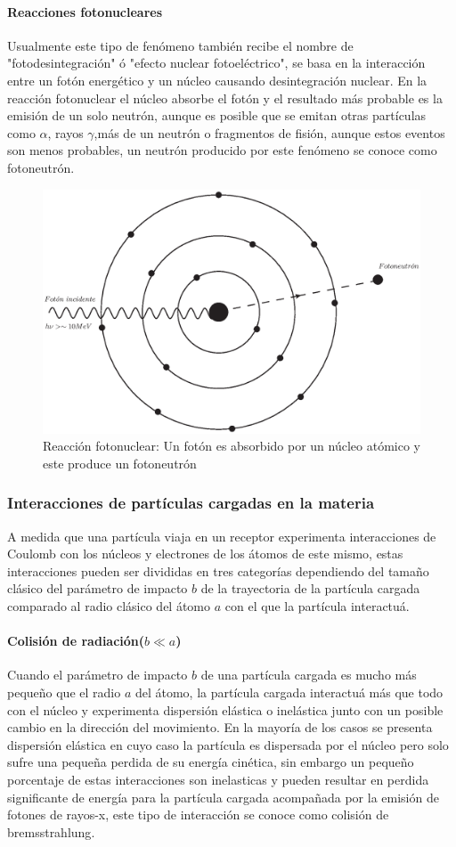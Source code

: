\paragraph{Reacciones fotonucleares}
 Usualmente este tipo de fenómeno también recibe el nombre de "fotodesintegración" ó "efecto nuclear fotoeléctrico", se basa en la interacción entre un fotón energético y un núcleo causando desintegración nuclear. En la reacción fotonuclear el núcleo absorbe el fotón y el resultado más probable es la emisión de un solo neutrón, aunque es posible que se emitan otras partículas como $\alpha$, rayos $\gamma$,más de un neutrón o fragmentos de fisión, aunque estos eventos son menos probables, un neutrón producido por este fenómeno se conoce como fotoneutrón\cite{Podgorsak}.

 \begin{figure}[htbp]
     \centering
     \includegraphics[width=.71\linewidth]{./Figures/fotoneu.eps}
     \caption[Reacción fotonuclear]{Reacción fotonuclear: Un fotón es absorbido por un núcleo atómico y este produce un fotoneutrón}
     \label{fig:RF}
 \end{figure}


\subsubsection{Interacciones de partículas cargadas en la materia}
A medida que una partícula viaja en un receptor experimenta interacciones de Coulomb con los núcleos y electrones de los átomos de este mismo, estas interacciones pueden ser divididas en tres categorías dependiendo del tamaño clásico del parámetro de impacto $b$ de la trayectoria de la partícula cargada comparado al radio clásico del átomo $a$ con el que la partícula interactuá.
\paragraph{Colisión de radiación($b\ll a$)}
Cuando el parámetro de impacto $b$ de una partícula cargada es mucho más pequeño que el radio $a$ del átomo, la partícula cargada interactuá más que todo con el núcleo y experimenta dispersión elástica o inelástica junto con un posible cambio en la dirección del movimiento. En la mayoría de los casos se presenta dispersión elástica en cuyo caso la partícula es dispersada por el núcleo pero solo sufre una pequeña perdida de su energía cinética, sin embargo un pequeño porcentaje de estas interacciones son inelasticas y pueden resultar en perdida significante de energía para la partícula cargada acompañada por la emisión de fotones de rayos-x, este tipo de interacción se conoce como colisión de bremsstrahlung\cite{Podgorsak}.



